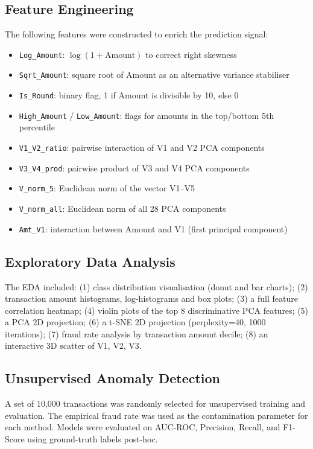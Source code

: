 \documentclass[conference]{IEEEtran}
\begin{document}
\subsection{Feature Engineering}
The following features were constructed to enrich the prediction signal:
\begin{itemize}
  \item \texttt{Log\_Amount}: $\log(1 + \text{Amount})$ to correct right skewness
  \item \texttt{Sqrt\_Amount}: square root of Amount as an alternative variance stabiliser
  \item \texttt{Is\_Round}: binary flag, 1 if Amount is divisible by 10, else 0
  \item \texttt{High\_Amount} / \texttt{Low\_Amount}: flags for amounts in the top/bottom 5th percentile
  \item \texttt{V1\_V2\_ratio}: pairwise interaction of V1 and V2 PCA components
  \item \texttt{V3\_V4\_prod}: pairwise product of V3 and V4 PCA components
  \item \texttt{V\_norm\_5}: Euclidean norm of the vector V1--V5
  \item \texttt{V\_norm\_all}: Euclidean norm of all 28 PCA components
  \item \texttt{Amt\_V1}: interaction between Amount and V1 (first principal component)
\end{itemize}

\subsection{Exploratory Data Analysis}
The EDA included: (1) class distribution visualisation (donut and bar charts); (2) transaction amount histograms, log-histograms and box plots; (3) a full feature correlation heatmap; (4) violin plots of the top 8 discriminative PCA features; (5) a PCA 2D projection; (6) a t-SNE 2D projection (perplexity=40, 1000 iterations); (7) fraud rate analysis by transaction amount decile; (8) an interactive 3D scatter of V1, V2, V3.

\subsection{Unsupervised Anomaly Detection}
A set of 10,000 transactions was randomly selected for unsupervised training and evaluation. The empirical fraud rate was used as the contamination parameter for each method. Models were evaluated on AUC-ROC, Precision, Recall, and F1-Score using ground-truth labels post-hoc.
\end{document}
